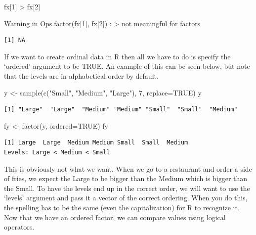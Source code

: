 \documentclass[
  letterpaper,
  DIV=11,
  numbers=noendperiod]{scrreprt}
\newenvironment{Shaded}{\begin{snugshade}}{\end{snugshade}}
\newcommand{\AttributeTok}[1]{\textcolor[rgb]{0.40,0.45,0.13}{#1}}
\newcommand{\ConstantTok}[1]{\textcolor[rgb]{0.56,0.35,0.01}{#1}}
\newcommand{\DecValTok}[1]{\textcolor[rgb]{0.68,0.00,0.00}{#1}}
\newcommand{\FunctionTok}[1]{\textcolor[rgb]{0.28,0.35,0.67}{#1}}
\newcommand{\NormalTok}[1]{\textcolor[rgb]{0.00,0.23,0.31}{#1}}
\newcommand{\OtherTok}[1]{\textcolor[rgb]{0.00,0.23,0.31}{#1}}
\newcommand{\SpecialCharTok}[1]{\textcolor[rgb]{0.37,0.37,0.37}{#1}}
\newcommand{\StringTok}[1]{\textcolor[rgb]{0.13,0.47,0.30}{#1}}
\begin{document}
\begin{Shaded}
\begin{Highlighting}[]
\NormalTok{fx[}\DecValTok{1}\NormalTok{] }\SpecialCharTok{\textgreater{}}\NormalTok{ fx[}\DecValTok{2}\NormalTok{]}
\end{Highlighting}
\end{Shaded}

{Warning in Ops.factor(fx{[}1{]}, fx{[}2{]}) :
\textquotesingle\textgreater\textquotesingle{} not meaningful for
factors}

\begin{verbatim}
[1] NA
\end{verbatim}

If we want to create ordinal data in R then all we have to do is specify
the `ordered' argument to be TRUE. An example of this can be seen below,
but note that the levels are in alphabetical order by default.

\begin{Shaded}
\begin{Highlighting}[]
\NormalTok{y }\OtherTok{\textless{}{-}} \FunctionTok{sample}\NormalTok{(}\FunctionTok{c}\NormalTok{(}\StringTok{"Small"}\NormalTok{, }\StringTok{"Medium"}\NormalTok{, }\StringTok{"Large"}\NormalTok{), }\DecValTok{7}\NormalTok{, }\AttributeTok{replace=}\ConstantTok{TRUE}\NormalTok{)}
\NormalTok{y}
\end{Highlighting}
\end{Shaded}

\begin{verbatim}
[1] "Large"  "Large"  "Medium" "Medium" "Small"  "Small"  "Medium"
\end{verbatim}

\begin{Shaded}
\begin{Highlighting}[]
\NormalTok{fy }\OtherTok{\textless{}{-}} \FunctionTok{factor}\NormalTok{(y, }\AttributeTok{ordered=}\ConstantTok{TRUE}\NormalTok{)}
\NormalTok{fy}
\end{Highlighting}
\end{Shaded}

\begin{verbatim}
[1] Large  Large  Medium Medium Small  Small  Medium
Levels: Large < Medium < Small
\end{verbatim}

This is obviously not what we want. When we go to a restaurant and order
a side of fries, we expect the Large to be bigger than the Medium which
is bigger than the Small. To have the levels end up in the correct
order, we will want to use the `levels' argument and pass it a vector of
the correct ordering. When you do this, the spelling has to be the same
(even the capitalization) for R to recognize it. Now that we have an
ordered factor, we can compare values using logical operators.
\end{document}
